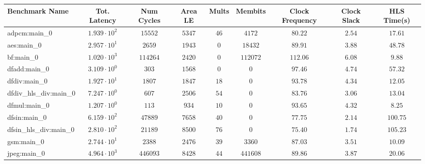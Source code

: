 \begin{tabular}{|l|c|c|c|c|c|c|c|c|}
\hline
Benchmark Name          & Tot. Latency           & Num Cycles & Area LE   & Mults   & Membits    & Clock Frequency & Clock Slack & HLS Time(s) \\
\hline
adpcm:main\_0           & $ 1.939 \cdot 10^{2} $ & $ 15552  $ & $ 5347  $ & $ 46  $ & $ 4172   $ & $ 80.22       $ & $ 2.54    $ & $ 17.61   $ \\
aes:main\_0             & $ 2.957 \cdot 10^{1} $ & $ 2659   $ & $ 1943  $ & $ 0   $ & $ 18432  $ & $ 89.91       $ & $ 3.88    $ & $ 48.78   $ \\
bf:main\_0              & $ 1.020 \cdot 10^{3} $ & $ 114264 $ & $ 2420  $ & $ 0   $ & $ 112072 $ & $ 112.06      $ & $ 6.08    $ & $ 9.88    $ \\
dfadd:main\_0           & $ 3.109 \cdot 10^{0} $ & $ 303    $ & $ 1568  $ & $ 0   $ & $ 0      $ & $ 97.46       $ & $ 4.74    $ & $ 57.32   $ \\
dfdiv:main\_0           & $ 1.927 \cdot 10^{1} $ & $ 1807   $ & $ 1847  $ & $ 18  $ & $ 0      $ & $ 93.78       $ & $ 4.34    $ & $ 12.05   $ \\
dfdiv\_hls\_div:main\_0 & $ 7.247 \cdot 10^{0} $ & $ 607    $ & $ 2506  $ & $ 54  $ & $ 0      $ & $ 83.76       $ & $ 3.06    $ & $ 13.04   $ \\
dfmul:main\_0           & $ 1.207 \cdot 10^{0} $ & $ 113    $ & $ 934   $ & $ 10  $ & $ 0      $ & $ 93.65       $ & $ 4.32    $ & $ 8.25    $ \\
dfsin:main\_0           & $ 6.159 \cdot 10^{2} $ & $ 47889  $ & $ 7658  $ & $ 40  $ & $ 0      $ & $ 77.75       $ & $ 2.14    $ & $ 100.75  $ \\
dfsin\_hls\_div:main\_0 & $ 2.810 \cdot 10^{2} $ & $ 21189  $ & $ 8500  $ & $ 76  $ & $ 0      $ & $ 75.40       $ & $ 1.74    $ & $ 105.23  $ \\
gsm:main\_0             & $ 2.744 \cdot 10^{1} $ & $ 2388   $ & $ 2476  $ & $ 39  $ & $ 3360   $ & $ 87.03       $ & $ 3.51    $ & $ 10.09   $ \\
jpeg:main\_0            & $ 4.964 \cdot 10^{3} $ & $ 446093 $ & $ 8428  $ & $ 44  $ & $ 441608 $ & $ 89.86       $ & $ 3.87    $ & $ 20.06   $ \\

\end{tabular}
